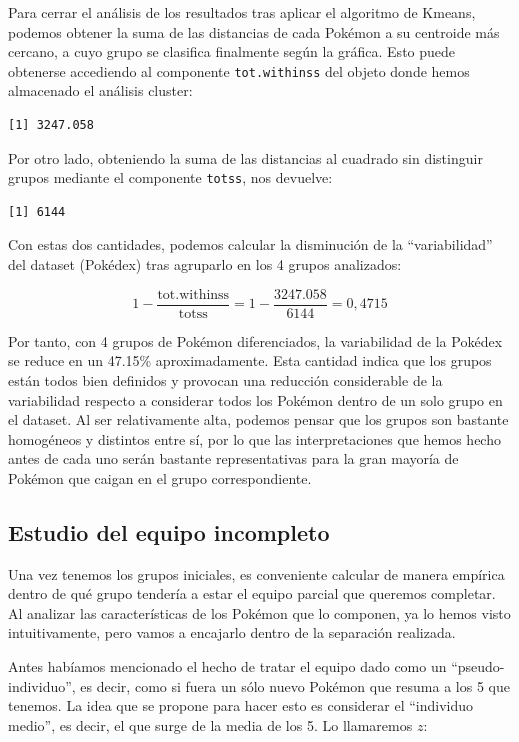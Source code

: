 \documentclass[
  12pt,
]{extreport}
\begin{document}
Para cerrar el análisis de los resultados tras aplicar el algoritmo de
Kmeans, podemos obtener la suma de las distancias de cada Pokémon a su
centroide más cercano, a cuyo grupo se clasifica finalmente según la
gráfica. Esto puede obtenerse accediendo al componente
\texttt{tot.withinss} del objeto donde hemos almacenado el análisis
cluster:

\begin{verbatim}
[1] 3247.058
\end{verbatim}

Por otro lado, obteniendo la suma de las distancias al cuadrado sin
distinguir grupos mediante el componente \texttt{totss}, nos devuelve:

\begin{verbatim}
[1] 6144
\end{verbatim}

Con estas dos cantidades, podemos calcular la disminución de la
``variabilidad'' del dataset (Pokédex) tras agruparlo en los 4 grupos
analizados:

\[
1 - \frac{\text{tot.withinss}}{\text{totss}} = 1 - \frac{3247.058}{6144} = 0,4715
\]

Por tanto, con 4 grupos de Pokémon diferenciados, la variabilidad de la
Pokédex se reduce en un 47.15\% aproximadamente. Esta cantidad indica
que los grupos están todos bien definidos y provocan una reducción
considerable de la variabilidad respecto a considerar todos los Pokémon
dentro de un solo grupo en el dataset. Al ser relativamente alta,
podemos pensar que los grupos son bastante homogéneos y distintos entre
sí, por lo que las interpretaciones que hemos hecho antes de cada uno
serán bastante representativas para la gran mayoría de Pokémon que
caigan en el grupo correspondiente.

\subsection{Estudio del equipo
incompleto}\label{estudio-del-equipo-incompleto}

Una vez tenemos los grupos iniciales, es conveniente calcular de manera
empírica dentro de qué grupo tendería a estar el equipo parcial que
queremos completar. Al analizar las características de los Pokémon que
lo componen, ya lo hemos visto intuitivamente, pero vamos a encajarlo
dentro de la separación realizada.

Antes habíamos mencionado el hecho de tratar el equipo dado como un
``pseudo-individuo'', es decir, como si fuera un sólo nuevo Pokémon que
resuma a los 5 que tenemos. La idea que se propone para hacer esto es
considerar el ``individuo medio'', es decir, el que surge de la media de
los 5. Lo llamaremos \(z\):
\end{document}
